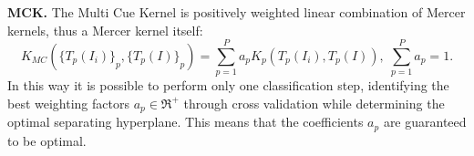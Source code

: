 \vspace{0.5cm}

\noindent\textbf{MCK.} The Multi Cue Kernel is positively
weighted linear combination of Mercer kernels, thus a Mercer kernel itself:
\begin{equation}
K_{MC}({\{T_{p}(I_{i})\}}_{p},{\{T_{p}(I)\}}_{p})=\sum_{p=1}^{P}a_{p}K_{p}(T_{p}(I_{i}),T_{p}(I)),
\; \sum_{p=1}^{P}a_{p}=1.\label{eq:MCK}
\end{equation}
In this way it is possible to perform only one classification
step, identifying the best weighting factors $a_{p}\in \Re^{+}$
through cross validation while
determining the optimal separating hyperplane. This means that the
coefficients $a_{p}$ are guaranteed to be optimal. 
 


%
%
%
%



